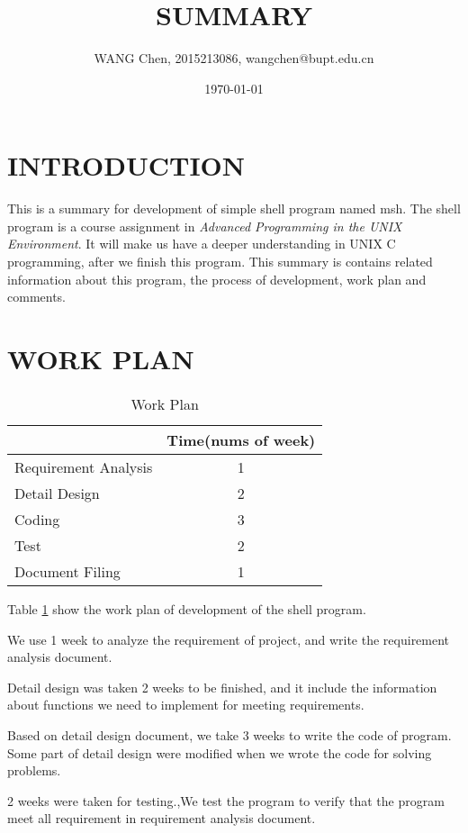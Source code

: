 \documentclass{article}
\title{SUMMARY}
\author{WANG Chen, 2015213086, wangchen@bupt.edu.cn}
\date{\today}
\begin{document}
\maketitle

\tableofcontents

\newpage
\section{INTRODUCTION}

This is a summary for development of simple shell program named msh.
The shell program is a course assignment in \emph{Advanced Programming in the UNIX Environment}.
It will make us have a deeper understanding in UNIX C programming, after we finish this program.
This summary is contains related information about this program, the process of development, work plan and comments.

\section{WORK PLAN}

\begin{table}[h]
\centering
\begin{tabular}{|l|c|}
\hline
 & Time(nums of week) \\ \hline
Requirement Analysis & 1 \\ \hline
Detail Design & 2 \\ \hline
Coding & 3 \\ \hline
Test & 2 \\ \hline
Document Filing & 1 \\ \hline
\end{tabular}
\caption{Work Plan}
\label{workPlan}
\end{table}

Table \ref{workPlan} show the work plan of development of the shell program.

We use 1 week to analyze the requirement of project, and write the requirement analysis document.

Detail design was taken 2 weeks to be finished, and it include the information about functions we need to implement for meeting requirements.

Based on detail design document, we take 3 weeks to write the code of program. Some part of detail design were modified when we wrote the code for solving problems.

2 weeks were taken for testing.,We test the program to verify that the program meet all requirement in requirement analysis document.
\end{document}
